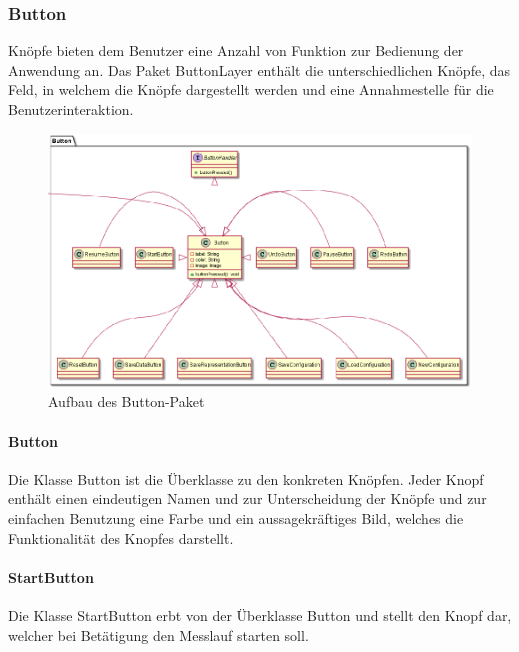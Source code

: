 \documentclass[parskip=full]{scrartcl}
\begin{document}
\newpage

\subsubsection{Button}

Knöpfe bieten dem Benutzer eine Anzahl von Funktion zur Bedienung der Anwendung an. Das Paket ButtonLayer enthält die unterschiedlichen Knöpfe, das Feld, in welchem die Knöpfe dargestellt werden und eine Annahmestelle für die Benutzerinteraktion.

\begin{figure}[htbp]
	\begin{center}
		\includegraphics[width = 14cm]{Grafiken/ButtonNamespace.png}
		\caption{Aufbau des Button-Paket}
		\label{Entwurf_Grob}
	\end{center}
\end{figure}

\paragraph{Button}

Die Klasse Button ist die Überklasse zu den konkreten Knöpfen. Jeder Knopf enthält einen eindeutigen Namen und zur Unterscheidung der Knöpfe und zur einfachen Benutzung eine Farbe und ein aussagekräftiges Bild, welches die Funktionalität des Knopfes darstellt.

\paragraph{StartButton}

Die Klasse StartButton erbt von der Überklasse Button und stellt den Knopf dar, welcher bei Betätigung den Messlauf starten soll.
\end{document}
